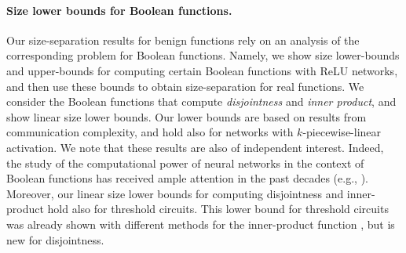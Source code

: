 \documentclass[11pt]{article}
\begin{document}
\paragraph{Size lower bounds for Boolean functions.}
Our size-separation results for benign functions rely on an analysis of the corresponding problem for Boolean functions. Namely, we show size lower-bounds and upper-bounds for computing certain Boolean functions with ReLU networks, and then use these bounds to obtain size-separation for real functions. 
We consider the Boolean functions that compute {\em disjointness} and {\em inner product}, and show linear size lower bounds. Our lower bounds are based on results from communication complexity, and hold also for networks with $k$-piecewise-linear activation.
%
We note that %
these results 
are also of independent interest.
Indeed, 
the study of the computational power of 
neural networks in the context of Boolean functions has received ample attention
in the past decades (e.g.,
\cite{maass1991computational,koiran1996vc,maass1997bounds,martens2013representational,kane2016super,mukherjee2017lower,williams2018limits}).
Moreover, our linear size lower bounds for computing disjointness and inner-product hold also for threshold circuits. This lower bound for threshold circuits was already shown with different methods for the inner-product function \citep{groeger1993linear,jukna2012boolean,roychowdhury1994lower}, but is new for disjointness.
\end{document}
